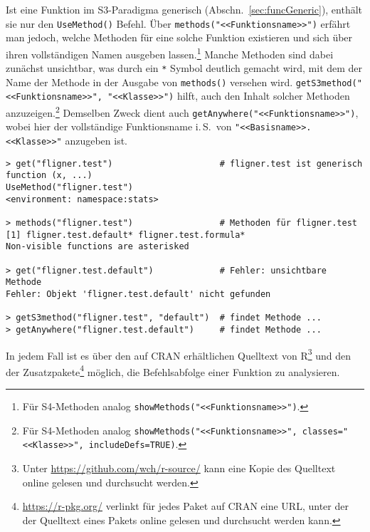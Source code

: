 Ist eine Funktion im S3-Paradigma generisch (Abschn.\ \ref{sec:funcGeneric}), enthält sie nur den \lstinline!UseMethod()! Befehl. Über \lstinline!methods("<<Funktionsname>>")! erfährt man jedoch, welche Methoden für eine solche Funktion existieren und sich über ihren vollständigen Namen ausgeben lassen.\footnote{Für S4-Methoden analog \lstinline!showMethods("<<Funktionsname>>")!.} Manche Methoden sind dabei zunächst unsichtbar, was durch ein \lstinline!*! Symbol deutlich gemacht wird, mit dem der Name der Methode in der Ausgabe von \lstinline!methods()! versehen wird. \lstinline!getS3method("<<Funktionsname>>", "<<Klasse>>")! hilft, auch den Inhalt solcher Methoden anzuzeigen.\footnote{Für S4-Methoden analog \lstinline!showMethods("<<Funktionsname>>", classes="<<Klasse>>", includeDefs=TRUE)!.} Demselben Zweck dient auch  \lstinline!getAnywhere("<<Funktionsname>>")!, wobei hier der vollständige Funktionsname i.\,S.\ von \lstinline!"<<Basisname>>.<<Klasse>>"! anzugeben ist.
\begin{lstlisting}
> get("fligner.test")                     # fligner.test ist generisch
function (x, ...)
UseMethod("fligner.test")
<environment: namespace:stats>

> methods("fligner.test")                 # Methoden für fligner.test
[1] fligner.test.default* fligner.test.formula*
Non-visible functions are asterisked

> get("fligner.test.default")             # Fehler: unsichtbare Methode
Fehler: Objekt 'fligner.test.default' nicht gefunden

> getS3method("fligner.test", "default")  # findet Methode ...
> getAnywhere("fligner.test.default")     # findet Methode ...
\end{lstlisting}

In jedem Fall ist es über den auf CRAN erhältlichen Quelltext von R\footnote{Unter \url{https://github.com/wch/r-source/} kann eine Kopie des Quelltext online gelesen und durchsucht werden.} und den der Zusatzpakete\footnote{\url{https://r-pkg.org/} verlinkt für jedes Paket auf CRAN eine URL, unter der der Quelltext eines Pakets online gelesen und durchsucht werden kann.} möglich, die Befehlsabfolge einer Funktion zu analysieren.

